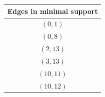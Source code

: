 \begin{tabular}{c}
Edges in minimal support \\
\hline
$(0,1)$ \\
$(0,8)$ \\
$(2,13)$ \\
$(3,13)$ \\
$(10,11)$ \\
$(10,12)$ \\
\end{tabular}
